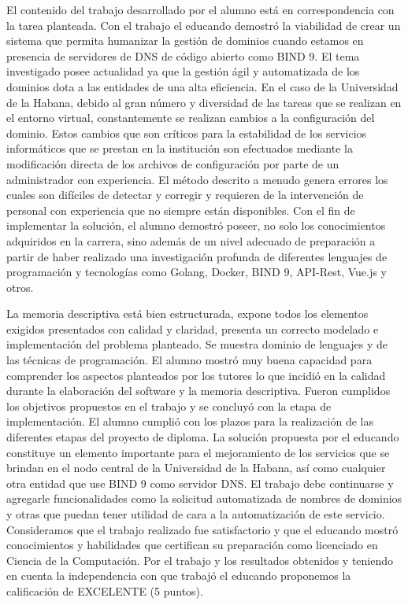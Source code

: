 \begin{opinion}
El contenido del trabajo desarrollado por el alumno está en correspondencia con la tarea planteada. Con el trabajo el educando demostró la viabilidad de crear un sistema que permita humanizar la gestión de dominios cuando estamos en presencia de servidores de DNS de código abierto como BIND 9. El tema investigado posee actualidad ya que la gestión ágil y automatizada de los dominios dota a las entidades de una alta eficiencia. En el caso de la Universidad de la Habana, debido al gran número y diversidad de las tareas que se realizan en el entorno virtual, constantemente se realizan cambios a la configuración del dominio. Estos cambios que son críticos para la estabilidad de los servicios informáticos que se prestan en la institución son efectuados mediante la modificación directa de los archivos de configuración por parte de un administrador con experiencia. El método descrito a menudo genera errores los cuales son difíciles de detectar y corregir y requieren de la intervención de personal con experiencia que no siempre están disponibles.
Con el fin de implementar la solución, el alumno demostró poseer, no solo los conocimientos adquiridos en la carrera, sino además de un nivel adecuado de preparación a partir de haber realizado una investigación profunda de diferentes lenguajes de programación y tecnologías como Golang, Docker, BIND 9, API-Rest, Vue.js y otros.

La memoria descriptiva está bien estructurada, expone todos los elementos exigidos presentados con calidad y claridad, presenta un correcto modelado e implementación del problema planteado. Se muestra dominio de lenguajes y de las técnicas de programación. El alumno mostró muy buena capacidad para comprender los aspectos planteados por los tutores lo que incidió en la calidad durante la elaboración del software y la memoria descriptiva. Fueron cumplidos los objetivos propuestos en el trabajo y se concluyó con la etapa de implementación. El alumno cumplió con los plazos para la realización de las diferentes etapas del proyecto de diploma.
La solución propuesta por el educando constituye un elemento importante para el mejoramiento de los servicios que se brindan en el nodo central de la Universidad de la Habana, así como cualquier otra entidad que use BIND 9 como servidor DNS. El trabajo debe continuarse y agregarle funcionalidades como la solicitud automatizada de nombres de dominios y otras que puedan tener utilidad de cara a la automatización de este servicio.
Consideramos que el trabajo realizado fue satisfactorio y que el educando mostró conocimientos y habilidades que certifican su preparación como licenciado en Ciencia de la Computación. 
Por el trabajo y los resultados obtenidos y teniendo en cuenta la independencia con que trabajó el educando proponemos la calificación de EXCELENTE (5 puntos).
\end{opinion}

